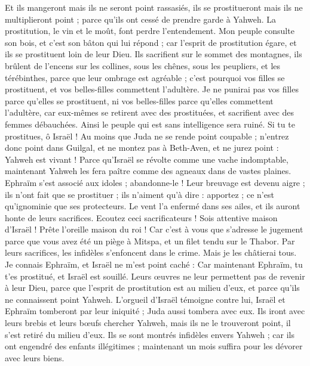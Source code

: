 \begin{multicols}{2}
Et ils mangeront mais ils ne seront point rassasiés, ils se prostitueront mais ils ne multiplieront point ; parce qu'ils ont cessé de prendre garde à Yahweh.
La prostitution, le vin et le moût, font perdre l'entendement.
Mon peuple consulte son bois, et c’est son bâton qui lui répond ; car l'esprit de prostitution égare, et ils se prostituent loin de leur Dieu.
Ils sacrifient sur le sommet des montagnes, ils brûlent de l’encens sur les collines, sous les chênes, sous les peupliers, et les térébinthes, parce que leur ombrage est agréable ; c'est pourquoi vos filles se prostituent, et vos belles-filles commettent l'adultère.
Je ne punirai pas vos filles parce qu’elles se prostituent, ni vos belles-filles parce qu’elles commettent l’adultère, car eux-mêmes se retirent avec des prostituées, et sacrifient avec des femmes débauchées. Ainsi le peuple qui est sans intelligence sera ruiné.
Si tu te prostitues, ô Israël ! Au moins que Juda ne se rende point coupable ; n'entrez donc point dans Guilgal, et ne montez pas à Beth-Aven, et ne jurez point : Yahweh est vivant !
Parce qu'Israël se révolte comme une vache indomptable, maintenant Yahweh les fera paître comme des agneaux dans de vastes plaines.
Ephraïm s'est associé aux idoles ; abandonne-le !
Leur breuvage est devenu aigre ; ils n'ont fait que se prostituer ; ils n'aiment qu'à dire : apportez ; ce n'est qu'ignominie que ses protecteurs.
Le vent l'a enfermé dans ses ailes, et ils auront honte de leurs sacrifices.
\VerseOne{}Ecoutez ceci sacrificateurs ! Sois attentive maison d'Israël ! Prête l'oreille maison du roi ! Car c’est à vous que s’adresse le jugement parce que vous avez été un piège à Mitspa, et un filet tendu sur le Thabor.
Par leurs sacrifices, les infidèles s’enfoncent dans le crime. Mais je les châtierai tous.
Je connais Ephraïm, et Israël ne m'est point caché : Car maintenant Ephraïm, tu t’es prostitué, et Israël est souillé.
Leurs œuvres ne leur permettent pas de revenir à leur Dieu, parce que l'esprit de prostitution est au milieu d'eux, et parce qu’ils ne connaissent point Yahweh.
L’orgueil d'Israël témoigne contre lui, Israël et Ephraïm tomberont par leur iniquité ; Juda aussi tombera avec eux.
Ils iront avec leurs brebis et leurs bœufs chercher Yahweh, mais ils ne le trouveront point, il s'est retiré du milieu d’eux.
Ils se sont montrés infidèles envers Yahweh ; car ils ont engendré des enfants illégitimes ; maintenant un mois suffira pour les dévorer avec leurs biens.

\end{multicols}
